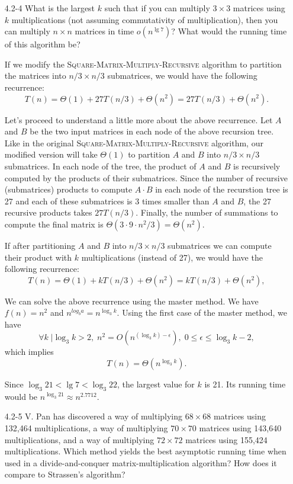 \documentclass{report}
\makeatletter
\renewenvironment{framed}{%
 \def\FrameCommand##1{\hskip\@totalleftmargin
 \fboxsep=\FrameSep\fbox{##1}}%
 \MakeFramed {\advance\hsize-\width
   \@totalleftmargin\z@ \linewidth\hsize
   \@setminipage}}%
 {\par\unskip\endMakeFramed}
\DeclareMathOperator{\Forall}{\forall}
\makeatother
\begin{document}
\begin{enumerate}
\item[4.2{-}4]{What is the largest $k$ such that if you can multiply
$3 \times 3$ matrices using $k$ multiplications (not assuming commutativity of
multiplication), then you can multiply $n \times n$ matrices in time
$o(n^{\lg 7})$?  What would the running time of this algorithm be?
}

\begin{framed}
If we modify the \textsc{Square-Matrix-Multiply-Recursive} algorithm to
partition the matrices into $n/3 \times n/3$ submatrices, we would have the
following recurrence:
\[
T(n) = \Theta(1) + 27 T(n/3) + \Theta(n^2) = 27 T(n/3) + \Theta(n^2).
\]

Let's proceed to understand a little more about the above recurrence. Let $A$
and $B$ be the two input matrices in each node of the above recursion tree.
Like in the original \textsc{Square-Matrix-Multiply-Recursive} algorithm, our
modified version will take $\Theta(1)$ to partition $A$ and $B$ into $n/3 \times
n/3$ submatrices. In each node of the tree, the product of $A$ and $B$ is
recursively computed by the products of their submatrices. Since the number of
recursive (submatrices) products to compute $A \cdot B$ in each node of the
recurstion tree is 27 and each of these submatrices is $3$ times smaller than
$A$ and $B$, the 27 recursive products takes $27 T(n/3)$. Finally, the number of
summations to compute the final matrix is
$\Theta(3 \cdot 9 \cdot n^2/3) = \Theta(n^2)$.

If after partitioning $A$ and $B$ into $n/3 \times n/3$ submatrices we can
compute their product with $k$ multiplications (instead of 27), we would have
the following recurrence:
\[
T(n) = \Theta(1) + k T(n/3) + \Theta(n^2) = k T(n/3) + \Theta(n^2),
\]

We can solve the above recurrence using the master method. We have
$f(n) = n^2$ and $n^{log_b a} = n^{\log_3 k}$. Using the first case of the master
method, we have
\[
\Forall k \; | \log_3 k > 2, \; n^2 = O(n^{(\log_3 k) - \epsilon}), \; 0 \le \epsilon \le \log_3 k - 2,
\]
which implies
\[
T(n) = \Theta(n^{\log_3 k}).
\]

Since $\log_3 21 < \lg 7 < \log_3 22$, the largest value for $k$ is 21. Its
running time would be $n^{\log_3 21} \approx n^{2.7712}$.

\end{framed}

\item[4.2{-}5]{V. Pan has discovered a way of multiplying $68 \times 68$
matrices using 132,464 multiplications, a way of multiplying $70 \times 70$
matrices using 143,640 multiplications, and a way of multiplying $72 \times 72$
matrices using 155,424 multiplications. Which method yields the best asymptotic
running time when used in a divide-and-conquer matrix-multiplication algorithm?
How does it compare to Strassen's algorithm?}


\end{enumerate}
\end{document}

